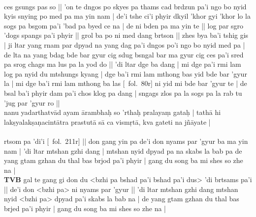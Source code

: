 \documentclass[12pt]{article}
\begin{document}
\textbf{\TVB}\\
ces gsungs pas so || 'on te dngos po skyes pa thams cad brdzun pa'i ngo bo nyid kyis snying po med pa ma yin nam | de'i tshe ci'i phyir dkyil 'khor gyi 'khor lo la sogs pa bsgom pa'i 'bad pa byed ce na | de ni bden pa ma yin te || log par sgro 'dogs spangs pa'i phyir || grol ba po ni med dang brtson || zhes bya ba'i tshig gis | ji ltar yang rnam par dpyad na yang dag pa'i dngos po'i ngo bo nyid med pa | de lta na yang bdag bde bar gyur cig sdug bsngal bar ma gyur cig ces pa'i sred pa srog chags ma lus pa la yod do || 'di ltar dge ba dang | mi dge pa'i rmi lam log pa nyid du mtshungs kyang | dge ba'i rmi lam mthong bas yid bde bar 'gyur la | mi dge ba'i rmi lam mthong ba las [\TVB\ fol.\ 80r] ni yid mi bde bar 'gyur te | de bsal ba'i phyir dam pa'i chos klog pa dang | sngags zlos pa la sogs pa la rab tu 'jug par 'gyur ro || \\

nanu yadarthatvād ayam ārambhaḥ so 'rthaḥ pralayaṃ gataḥ | tathā hi lakṣyalakṣaṇacintātra prastutā sā ca vismṛtā, kva gateti na jñāyate |\\

\textbf{\TVA}\\
rtsom pa 'di'i [\TVA\ fol.\ 211r] || don gang yin pa de'i don nyams par 'gyur ba ma yin nam | 'di ltar mtshan gzhi dang | mtshan nyid dpyad pa na skabs la bab pa de yang gtam gzhan du thal bas brjod pa'i phyir | gang du song ba mi shes so zhe na | \\

\textbf{TVB}
gal te gang gi don du <bzhi pa bshad pa'i bshad pa'i dus> 'di brtsams pa'i || de'i don <bzhi pa> ni nyams par 'gyur || 'di ltar mtshan gzhi dang mtshan nyid <bzhi pa> dpyad pa'i skabs la bab na | de yang gtam gzhan du thal bas brjed pa'i phyir | gang du song ba mi shes so zhe na |\\
\end{document}
